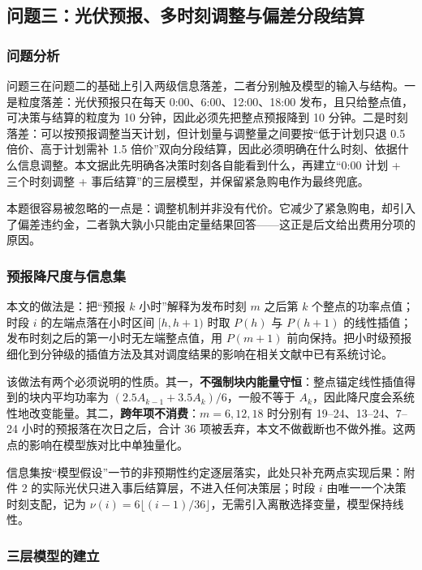 \subsection{问题三：光伏预报、多时刻调整与偏差分段结算}

\subsubsection{问题分析}

问题三在问题二的基础上引入两级信息落差，二者分别触及模型的输入与结构。一是粒度落差：光伏预报只在每天 0:00、6:00、12:00、18:00 发布，且只给整点值，可决策与结算的粒度为 10 分钟，因此必须先把整点预报降到 10 分钟。二是时刻落差：可以按预报调整当天计划，但计划量与调整量之间要按“低于计划只退 0.5 倍价、高于计划需补 1.5 倍价”双向分段结算，因此必须明确在什么时刻、依据什么信息调整。本文据此先明确各决策时刻各自能看到什么，再建立“0:00 计划 + 三个时刻调整 + 事后结算”的三层模型，并保留紧急购电作为最终兜底。

本题很容易被忽略的一点是：调整机制并非没有代价。它减少了紧急购电，却引入了偏差违约金，二者孰大孰小只能由定量结果回答——这正是后文给出费用分项的原因。

\subsubsection{预报降尺度与信息集}

本文的做法是：把“预报 $k$ 小时”解释为发布时刻 $m$ 之后第 $k$ 个整点的功率点值；时段 $i$ 的左端点落在小时区间 $[h,h+1)$ 时取 $P(h)$ 与 $P(h+1)$ 的线性插值；发布时刻之后的第一小时无左端整点值，用 $P(m+1)$ 前向保持。把小时级预报细化到分钟级的插值方法及其对调度结果的影响在相关文献中已有系统讨论\cite{ref-almpantis-2024-minute-downscaling,ref-barbieri-2017-very-short-term-pv,ref-stenzel-2016-temporal-resolution}。

该做法有两个必须说明的性质。其一，\textbf{不强制块内能量守恒}：整点锚定线性插值得到的块内平均功率为 $(2.5A_{k-1}+3.5A_k)/6$，一般不等于 $A_k$，因此降尺度会系统性地改变能量。其二，\textbf{跨年项不消费}：$m=6,12,18$ 时分别有 19--24、13--24、7--24 小时的预报落在次日之后，合计 36 项被丢弃，本文不做截断也不做外推。这两点的影响在模型族对比中单独量化。

信息集按“模型假设”一节的非预期性约定逐层落实，此处只补充两点实现后果：附件 2 的实际光伏只进入事后结算层，不进入任何决策层；时段 $i$ 由唯一一个决策时刻支配，记为 $\nu(i)=6\lfloor(i-1)/36\rfloor$，无需引入离散选择变量，模型保持线性。

\subsubsection{三层模型的建立}

